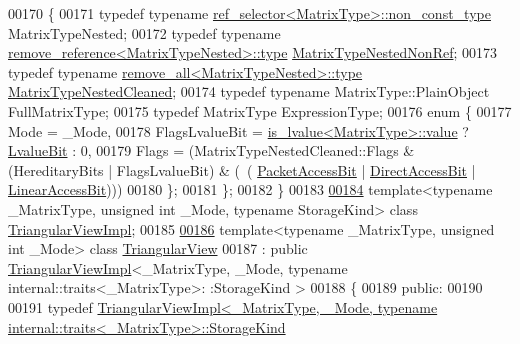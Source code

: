 \begin{DoxyCode}
00170 \{
00171   \textcolor{keyword}{typedef} \textcolor{keyword}{typename} \hyperlink{struct_eigen_1_1internal_1_1ref__selector}{ref\_selector<MatrixType>::non\_const\_type} 
      MatrixTypeNested;
00172   \textcolor{keyword}{typedef} \textcolor{keyword}{typename} \hyperlink{group___sparse_core___module}{remove\_reference<MatrixTypeNested>::type} 
      \hyperlink{group___sparse_core___module}{MatrixTypeNestedNonRef};
00173   \textcolor{keyword}{typedef} \textcolor{keyword}{typename} \hyperlink{group___sparse_core___module}{remove\_all<MatrixTypeNested>::type} 
      \hyperlink{group___sparse_core___module}{MatrixTypeNestedCleaned};
00174   \textcolor{keyword}{typedef} \textcolor{keyword}{typename} MatrixType::PlainObject FullMatrixType;
00175   \textcolor{keyword}{typedef} MatrixType ExpressionType;
00176   \textcolor{keyword}{enum} \{
00177     Mode = \_Mode,
00178     FlagsLvalueBit = \hyperlink{struct_eigen_1_1internal_1_1is__lvalue}{is\_lvalue<MatrixType>::value} ? 
      \hyperlink{group__flags_gae2c323957f20dfdc6cb8f44428eaec1a}{LvalueBit} : 0,
00179     Flags = (MatrixTypeNestedCleaned::Flags & (HereditaryBits | FlagsLvalueBit) & (~(
      \hyperlink{group__flags_ga1a306a438e1ab074e8be59512e887b9f}{PacketAccessBit} | \hyperlink{group__flags_gabf1e9d0516a933445a4c307ad8f14915}{DirectAccessBit} | 
      \hyperlink{group__flags_ga4b983a15d57cd55806df618ac544d09e}{LinearAccessBit})))
00180   \};
00181 \};
00182 \}
00183 
\hyperlink{class_eigen_1_1_triangular_view_impl}{00184} \textcolor{keyword}{template}<\textcolor{keyword}{typename} \_MatrixType, \textcolor{keywordtype}{unsigned} \textcolor{keywordtype}{int} \_Mode, \textcolor{keyword}{typename} StorageKind> \textcolor{keyword}{class }
      \hyperlink{class_eigen_1_1_triangular_view_impl}{TriangularViewImpl};
00185 
\hyperlink{group___core___module}{00186} \textcolor{keyword}{template}<\textcolor{keyword}{typename} \_MatrixType, \textcolor{keywordtype}{unsigned} \textcolor{keywordtype}{int} \_Mode> \textcolor{keyword}{class }\hyperlink{group___core___module_class_eigen_1_1_triangular_view}{TriangularView}
00187   : \textcolor{keyword}{public} \hyperlink{class_eigen_1_1_triangular_view_impl}{TriangularViewImpl}<\_MatrixType, \_Mode, typename internal::traits<\_MatrixType>:
      :StorageKind >
00188 \{
00189   \textcolor{keyword}{public}:
00190 
00191     \textcolor{keyword}{typedef} 
      \hyperlink{class_eigen_1_1_triangular_view_impl}{TriangularViewImpl<\_MatrixType, \_Mode, typename internal::traits<\_MatrixType>::StorageKind}

\end{DoxyCode}
